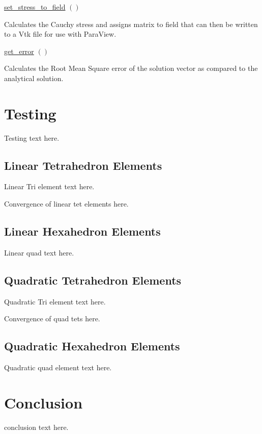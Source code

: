\documentclass[a4paper, 12pt]{article}
\begin{document}
\vspace{\baselineskip}
\begin{algorithm}[H]
  \underline{set\_stress\_to\_field} $()$
  \BlankLine
  \caption{Calculates the Cauchy stress and assigns matrix to field that
           can then be written to a Vtk file for use with ParaView.}
  \label{al:CauchyStress}
\end{algorithm}

\vspace{\baselineskip}
\begin{algorithm}[H]
  \underline{get\_error} $()$
  \BlankLine
  \caption{Calculates the Root Mean Square error of the solution vector
            as compared to the analytical solution.}
  \label{al:getError}
\end{algorithm}
\vspace{\baselineskip}

\section{Testing} \label{sec:testing}
Testing text here.

\subsection{Linear Tetrahedron Elements} \label{subsec:linTet}
Linear Tri element text here.

Convergence of linear tet elements here.

\subsection{Linear Hexahedron Elements} \label{subsec:linHex}
Linear quad text here.

\subsection{Quadratic Tetrahedron Elements} \label{subsec:quadTet}
Quadratic Tri element text here.

Convergence of quad tets here.

\subsection{Quadratic Hexahedron Elements} \label{subsec:quadHex}
Quadratic quad element text here.

\section{Conclusion} \label{sec:conclusion}
conclusion text here.
\end{document}
